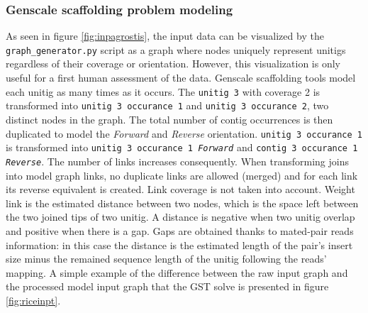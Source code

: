 \documentclass[12pt]{article}
\begin{document}
\subsubsection{Genscale scaffolding problem modeling} \label{sec:gstmodeling}
As seen in figure \ref{fig:inpagrostis}, the input data can be visualized by the \texttt{graph\_generator.py} script as a graph where nodes uniquely represent unitigs regardless of their coverage or orientation. However, this visualization is only useful for a first human assessment of the data. 
Genscale scaffolding tools model each unitig as many times as it occurs. The \texttt{unitig 3} with coverage 2 is transformed into \texttt{unitig 3 occurance 1} and \texttt{unitig 3 occurance 2}, two distinct nodes in the graph. The total number of contig occurrences is then duplicated to model the \textit{Forward} and \textit{Reverse} orientation. \texttt{unitig 3 occurance 1} is transformed into \texttt{unitig 3 occurance 1 \textit{Forward}} and \texttt{contig 3 occurance 1 \textit{Reverse}}. The number of links increases consequently. When transforming joins into model graph links, no duplicate links are allowed (merged) and for each link its reverse equivalent is created. Link coverage is not taken into account. Weight link is the estimated distance between two nodes, which is the space left between the two joined tips of two unitig. A distance is negative when two unitig overlap and positive when there is a gap. Gaps are obtained thanks to mated-pair reads information: in this case the distance is the estimated length of the pair's insert size minus the remained sequence length of the unitig following the reads' mapping. A simple example of the difference between the raw input graph and the processed model input graph that the GST solve is presented in figure \ref{fig:riceinpt}.
\end{document}
